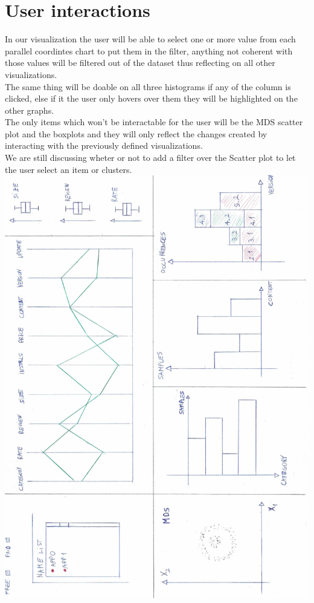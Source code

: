 \documentclass[a4paper, 11pt]{article}
\begin{document}
\section{User interactions}
In our visualization the user will be able to select one or more value from each parallel coordintes chart to put them in the filter, anything not coherent with those values will be filtered out of the dataset thus reflecting on all other visualizations.\\
The same thing will be doable on all three histograms if any of the column is clicked, else if it the user only hovers over them they will be highlighted on the other graphs.\\
The only items which won't be interactable for the user will be the MDS scatter plot and the boxplots and they will only reflect the changes created by interacting with the previously defined visualizations. \\
We are still discussing wheter or not to add a filter over the Scatter plot to let the user select an item or clusters.
\includegraphics[width=\textwidth, angle=180]{mockup.png}
\end{document}
